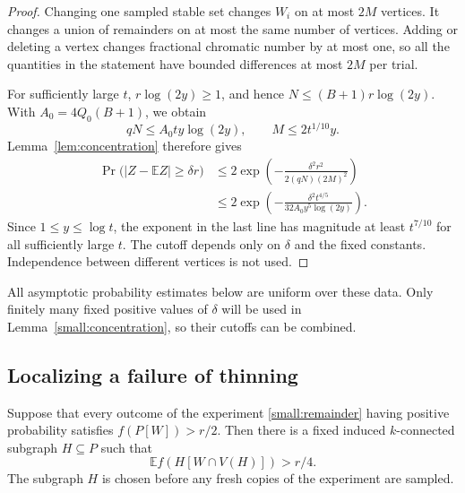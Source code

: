 \begin{proof}
Changing one sampled stable set changes $W_i$ on at most $2M$ vertices.
It changes a union of remainders on at most the same number of vertices.
Adding or deleting a vertex changes fractional chromatic number by at
most one, so all the quantities in the statement have bounded differences
at most $2M$ per trial.

For sufficiently large $t$, $r\log(2y)\ge1$, and hence
$N\le(B+1)r\log(2y)$. With
$A_0=4Q_0(B+1)$, we obtain
\[
 qN\le A_0ty\log(2y),\qquad M\le2t^{1/10}y.
\]
Lemma~\ref{lem:concentration} therefore gives
\begin{align*}
 \Pr\bigl(|Z-\mathbb EZ|\ge\delta r\bigr)
 &\le2\exp\left(-\frac{\delta^2r^2}{2(qN)(2M)^2}\right)\\
 &\le2\exp\left(
 -\frac{\delta^2t^{4/5}}{32A_0y^5\log(2y)}\right).
\end{align*}
Since $1\le y\le\log t$, the exponent in the last line has magnitude at
least $t^{7/10}$ for all sufficiently large $t$. The cutoff depends only
on $\delta$ and the fixed constants. Independence between different
vertices is not used.
\end{proof}

All asymptotic probability estimates below are uniform over these data.
Only finitely many fixed positive values of $\delta$ will be used in
Lemma~\ref{small:concentration}, so their cutoffs can be combined.

\subsection{Localizing a failure of thinning}

\begin{lemma}\label{small:fixed-region}
Suppose that every outcome of the experiment
\eqref{small:remainder} having positive probability satisfies
$f(P[W])>r/2$. Then there is a fixed induced $k$-connected subgraph
$H\subseteq P$ such that
\begin{equation}\label{small:region-expectation}
 \mathbb E f(H[W\cap V(H)])>r/4.
\end{equation}
The subgraph $H$ is chosen before any fresh copies of the experiment
are sampled.
\end{lemma}


